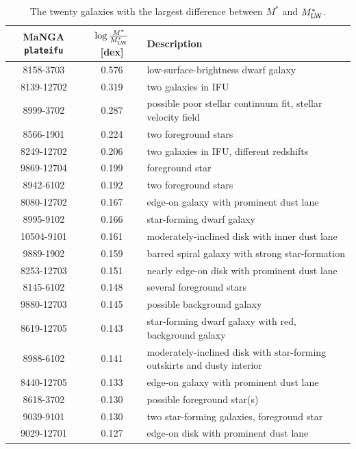 \begin{table}
    \centering
    \begin{tabular}{||c||c|p{4in}||} \hline
        MaNGA \texttt{plateifu} & $\log \frac{M^*}{M^*_{\rm LW}}$ [dex] & Description \\ \hline \hline
        8158-3703 & 0.576 & low-surface-brightness dwarf galaxy \\ \hline
        8139-12702 & 0.319 & two galaxies in IFU \\ \hline
        8999-3702 & 0.287 & possible poor stellar continuum fit, stellar velocity field \\ \hline
        8566-1901 & 0.224 & two foreground stars \\ \hline
        8249-12702 & 0.206 & two galaxies in IFU, different redshifts \\ \hline
        9869-12704 & 0.199 & foreground star \\ \hline
        8942-6102 & 0.192 & two foreground stars \\ \hline
        8080-12702 & 0.167 & edge-on galaxy with prominent dust lane \\ \hline
        8995-9102 & 0.166 & star-forming dwarf galaxy \\ \hline
        10504-9101 & 0.161 & moderately-inclined disk with inner dust lane \\ \hline
        9889-1902 & 0.159 & barred spiral galaxy with strong star-formation \\ \hline
        8253-12703 & 0.151 & nearly edge-on disk with prominent dust lane \\ \hline
        8145-6102 & 0.148 & several foreground stars \\ \hline
        9880-12703 & 0.145 & possible background galaxy \\ \hline
        8619-12705 & 0.143 & star-forming dwarf galaxy with red, background galaxy \\ \hline
        8988-6102 & 0.141 & moderately-inclined disk with star-forming outskirts and dusty interior \\ \hline
        8440-12705 & 0.133 & edge-on galaxy with prominent dust lane \\ \hline
        8618-3702 & 0.130 & possible foreground star(s) \\ \hline
        9039-9101 & 0.130 & two star-forming galaxies, foreground star \\ \hline
        9029-12701 & 0.127 & edge-on disk with prominent dust lane \\ \hline
    \end{tabular}
    \caption{\fixspacing The twenty galaxies with the largest difference between $M^*$ and $M^*_{\rm LW}$.}
    \label{tab:rogues_gallery}
\end{table}

